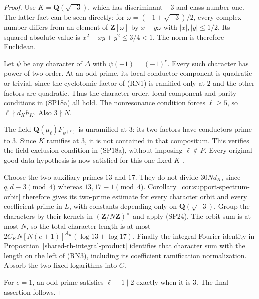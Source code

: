 \begin{proof}
Use $K=\mathbf Q(\sqrt{-3})$, which has discriminant $-3$
and class number one.  The latter fact can be seen directly:
for $\omega=(-1+\sqrt{-3})/2$, every complex number differs
from an element of $\mathbf Z[\omega]$ by $x+y\omega$ with
$|x|,|y|\le1/2$.  Its squared absolute value is
$x^2-xy+y^2\le3/4<1$.  The norm is therefore Euclidean.

Let $\psi$ be any character of $\Delta$ with
$\psi(-1)=(-1)^e$.  Every such character has power-of-two
order.  At an odd prime, its local conductor component is
quadratic or trivial, since the cyclotomic factor of (RN1)
is ramified only at $2$ and the other factors are quadratic.
Thus the character-order, local-component and parity
conditions in (SP18a) all hold.  The nonresonance condition
forces $\ell\ge5$, so $\ell\nmid d_Kh_K$.
Also $3\nmid N$.

The field $\mathbf Q(\mu_\ell)F_{\psi^{(\ell)}}$ is
unramified at $3$: its two factors have conductors prime
to $3$.  Since $K$ ramifies at $3$, it is not contained
in that compositum.  This verifies the field-exclusion
condition in (SP18a), without imposing
$\ell\notin P$.  Every original good-data hypothesis
is now satisfied for this one fixed $K$
\cite{rh-selmer-nonresonant-source}.

Choose the two auxiliary primes $13$ and $17$.  They do
not divide $30Nd_K$, since $q,d\equiv3\pmod4$ whereas
$13,17\equiv1\pmod4$.  Corollary~\ref{cor:support-spectrum-orbit}
therefore gives its two-prime estimate for every character
orbit and every coefficient prime in $L$, with constants
depending only on $\mathbf Q(\sqrt{-3})$.
Group the characters by their kernels in
$(\mathbf Z/N\mathbf Z)^\times$ and apply (SP24).
The orbit sum is at most $N$, so the total character
length is at most
$2C_KN[N(e+1)]^{A_K}(\log13+\log17)$.
Finally the integral Fourier identity in
Proposition~\ref{shared-rh-integral-product} identifies
that character sum with the length on the left of (RN3),
including its coefficient ramification normalization.
Absorb the two fixed logarithms into $C$.

For $e=1$, an odd prime satisfies $\ell-1\mid2$ exactly
when it is $3$.  The final assertion follows.
\end{proof}

